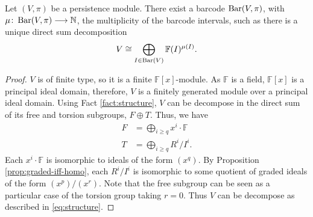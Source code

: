 \begin{theorem}[Structure] \cite[Proposition 4.8]{wang} \label{structure}
    Let $ (V, \pi) $ be a persistence module. There exist a barcode $ \operatorname{Bar}(V, \pi) $, with $ \mu \colon \operatorname{Bar} (V, \pi) \longrightarrow \mathbb N $, the multiplicity of the barcode intervals, such as there is a unique direct sum decomposition
    \begin{align}
        V \cong \bigoplus_{I \in  \operatorname{Bar} (V)} \mathbb F (I)^{\mu (I)}. \label{eq:structure}
    \end{align}
\end{theorem}
\begin{proof}
    $ V $ is of finite type, so it is a finite $ \mathbb F[x] $-module. As $ \mathbb F $ is a field, $ \mathbb F[x] $ is a principal ideal domain, therefore, $ V $ is a finitely generated module over a principal ideal domain. Using Fact \ref{fact:structure}, $ V $ can be decompose in the direct sum of its free and torsion subgroups, $ F \oplus T $. Thus, we have
    \begin{align}
        F &= \bigoplus_{i\geq q} x^i \cdot \mathbb F \\
        T &= \bigoplus_{i\geq q} R^i / I^i.
    \end{align}
    Each $ x^i \cdot \mathbb F $ is isomorphic to ideals of the form $ (x^q) $. By Proposition \ref{prop:graded-iff-homo}, each $ R^i / I^i $ is isomorphic to some quotient of graded ideals of the form $ (x^p) / (x^r)$. Note that the free subgroup can be seen as a particular case of the torsion group taking $ r = 0 $. Thus $ V $ can be decompose as described in \eqref{eq:structure}.
\end{proof}

\newpage
